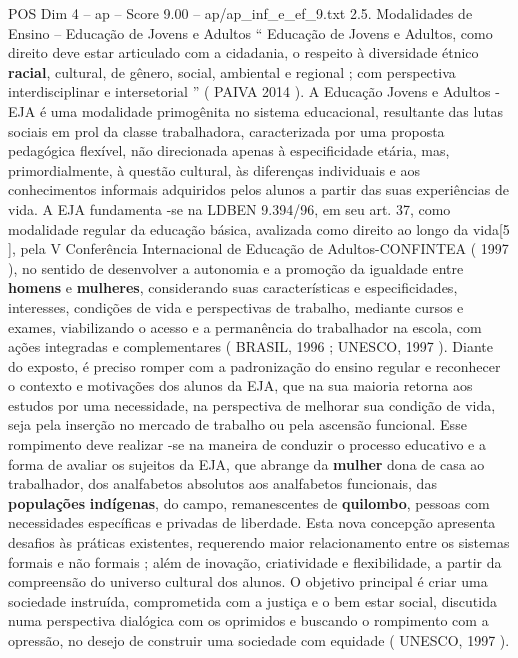 \begin{textsample}{POS Dim 4 – ap – Score 9.00 – ap/ap\_inf\_e\_ef\_9.txt}  \label{ex:f4_pos_233}
2.5.
Modalidades de Ensino – Educação de Jovens e Adultos “ Educação de Jovens e Adultos, como direito deve estar articulado com a cidadania, o respeito à diversidade étnico \textbf{racial}, cultural, de gênero, social, ambiental e regional ; com perspectiva interdisciplinar e intersetorial ” ( PAIVA 2014 ).
A Educação Jovens e Adultos - EJA é uma modalidade primogênita no sistema educacional, resultante das lutas sociais em prol da classe trabalhadora, caracterizada por uma proposta pedagógica flexível, não direcionada apenas à especificidade etária, mas, primordialmente, à questão cultural, às diferenças individuais e aos conhecimentos informais adquiridos pelos alunos a partir das suas experiências de vida.
A EJA fundamenta -se na LDBEN 9.394/96, em seu art. 37, como modalidade regular da educação básica, avalizada como direito ao longo da vida[5 ], pela V Conferência Internacional de Educação de Adultos-CONFINTEA ( 1997 ), no sentido de desenvolver a autonomia e a promoção da igualdade entre \textbf{homens} e \textbf{mulheres}, considerando suas características e especificidades, interesses, condições de vida e perspectivas de trabalho, mediante cursos e exames, viabilizando o acesso e a permanência do trabalhador na escola, com ações integradas e complementares ( BRASIL, 1996 ; UNESCO, 1997 ).
Diante do exposto, é preciso romper com a padronização do ensino regular e reconhecer o contexto e motivações dos alunos da EJA, que na sua maioria retorna aos estudos por uma necessidade, na perspectiva de melhorar sua condição de vida, seja pela inserção no mercado de trabalho ou pela ascensão funcional.
Esse rompimento deve realizar -se na maneira de conduzir o processo educativo e a forma de avaliar os sujeitos da EJA, que abrange da \textbf{mulher} dona de casa ao trabalhador, dos analfabetos absolutos aos analfabetos funcionais, das \textbf{populações} \textbf{indígenas}, do campo, remanescentes de \textbf{quilombo}, pessoas com necessidades específicas e privadas de liberdade.
Esta nova concepção apresenta desafios às práticas existentes, requerendo maior relacionamento entre os sistemas formais e não formais ; além de inovação, criatividade e flexibilidade, a partir da compreensão do universo cultural dos alunos.
O objetivo principal é criar uma sociedade instruída, comprometida com a justiça e o bem estar social, discutida numa perspectiva dialógica com os oprimidos e buscando o rompimento com a opressão, no desejo de construir uma sociedade com equidade ( UNESCO, 1997 ).

\end{textsample}
